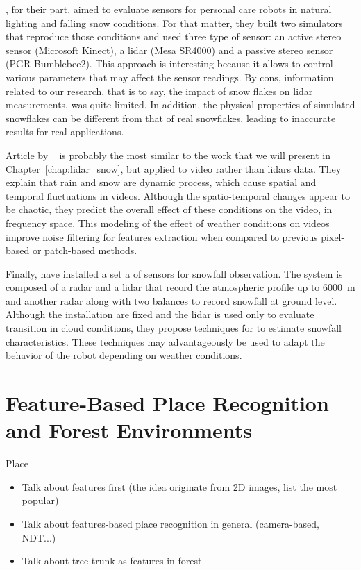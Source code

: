 \citet{sumi-arso-13}, for their part, aimed to evaluate sensors for personal care robots in natural lighting and falling snow conditions. For that matter, they built two simulators that reproduce those conditions and used three type of sensor: an active stereo sensor (Microsoft Kinect), a \gls*{lidar} (Mesa SR4000) and a passive stereo sensor (PGR Bumblebee2). This approach is interesting because it allows to control various parameters that may affect the sensor readings. By cons, information related to our research, that is to say, the impact of snow flakes on \gls*{lidar} measurements, was quite limited. In addition, the physical properties of simulated snowflakes can be different from that of real snowflakes, leading to inaccurate results for real applications.

Article by ~\citet{barnum2010analysis} is probably the most similar to the work that we will present in Chapter~\ref{chap:lidar_snow}, but applied to video rather than \gls*{lidar}s data. They explain that rain and snow are dynamic process, which cause spatial and temporal fluctuations in videos. Although the spatio-temporal changes appear to be chaotic, they predict the overall effect of these conditions on the video, in frequency space. This modeling of the effect of weather conditions on videos improve noise filtering for features extraction when compared to previous pixel-based or patch-based methods.

Finally, \citet{servomaa2002snowfall} have installed a set a of sensors for snowfall observation. The system is composed of a radar and a \gls*{lidar} that record the atmospheric profile up to \SI{6000}{\meter} and another radar along with two balances to record snowfall at ground level. Although the installation are fixed and the \gls*{lidar} is used only to evaluate transition in cloud conditions, they propose techniques for to estimate snowfall characteristics. These techniques may advantageously be used to adapt the behavior of the robot depending on weather conditions.  



\section{Feature-Based Place Recognition and Forest Environments}
\label{sec:literature_slam}
Place 
\begin{itemize}
    \item Talk about features first (the idea originate from 2D images, list the most popular)
    \item Talk about features-based place recognition in general (camera-based, NDT...)
    \item Talk about tree trunk as features in forest
\end{itemize}

